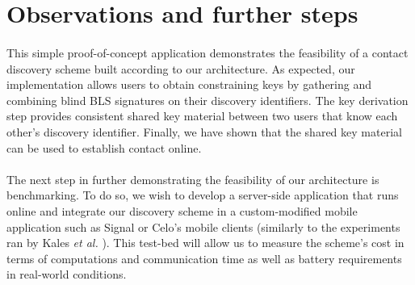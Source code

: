 \section{Observations and further steps}


\paragraph{} This simple proof-of-concept application demonstrates the feasibility of a contact discovery scheme built according to our architecture. As expected, our implementation allows users to obtain constraining keys by gathering and combining blind BLS signatures on their discovery identifiers. The key derivation step provides consistent shared key material between two users that know each other's discovery identifier. Finally, we have shown that the shared key material can be used to establish contact online.


\paragraph{} The next step in further demonstrating the feasibility of our architecture is benchmarking. To do so, we wish to develop a server-side application that runs online and integrate our discovery scheme in a custom-modified mobile application such as Signal or Celo's mobile clients (similarly to the experiments ran by Kales \textit{et al.} \cite{Kales19}). This test-bed will allow us to measure the scheme's cost in terms of computations and communication time as well as battery requirements in real-world conditions.































